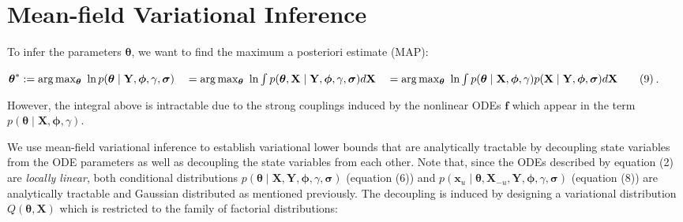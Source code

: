 \section{Mean-field Variational Inference}

\begin{par}
To infer the parameters $\boldsymbol{\theta}$, we want to find the maximum a posteriori estimate (MAP):
\end{par} \vspace{1em}
\begin{par}
$\boldsymbol{\theta}^* := \mathrm{arg} \max_{\boldsymbol{\theta}} ~ \ln p(\boldsymbol{\theta} \mid\mathbf{Y},\boldsymbol{\phi},\gamma,\boldsymbol\sigma)\\ \quad= \mathrm{arg}\max_{\boldsymbol{\theta}} ~ \ln \int  p(\boldsymbol{\theta},\mathbf{X} \mid\mathbf{Y},\boldsymbol{\phi},\gamma,\boldsymbol\sigma) d\mathbf{X}\\ \quad= \mathrm{arg}\max_{\boldsymbol{\theta}} ~ \ln \int p(\boldsymbol{\theta} \mid \mathbf{X},\boldsymbol{\phi},\gamma)p(\mathbf{X} \mid \mathbf{Y}, \boldsymbol{\phi},\boldsymbol\sigma) d\mathbf{X} \qquad(9)$.
\end{par} \vspace{1em}
\begin{par}
However, the integral above is intractable due to the strong couplings induced by the nonlinear ODEs $\mathbf{f}$ which appear in the term $p(\boldsymbol{\theta} \mid \mathbf{X},\boldsymbol{\phi},\gamma)$.
\end{par} \vspace{1em}
\begin{par}
We use mean-field variational inference to establish variational lower bounds that are analytically tractable by decoupling state variables from the ODE parameters as well as decoupling the state variables from each other. Note that, since the ODEs described by equation (2) are \textit{locally linear}, both conditional distributions $p(\boldsymbol{\theta} \mid\mathbf{X},\mathbf{Y},\boldsymbol{\phi},\gamma,\boldsymbol\sigma)$ (equation (6)) and $p(\mathbf{x}_u \mid \boldsymbol{\theta},\mathbf{X}_{-u},\mathbf{Y},\boldsymbol{\phi},\gamma,\boldsymbol\sigma)$ (equation (8)) are analytically tractable and Gaussian distributed as mentioned previously. The decoupling is induced by designing a variational distribution $Q(\boldsymbol{\theta},\mathbf{X})$ which is restricted to the family of factorial distributions:
\end{par} \vspace{1em}
